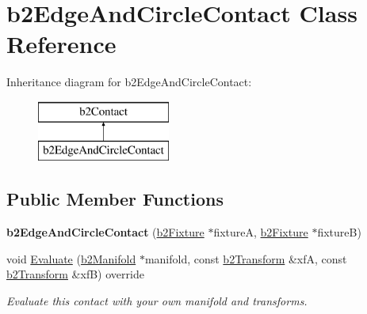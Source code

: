 \hypertarget{classb2EdgeAndCircleContact}{}\section{b2\+Edge\+And\+Circle\+Contact Class Reference}
\label{classb2EdgeAndCircleContact}
Inheritance diagram for b2\+Edge\+And\+Circle\+Contact\+:\begin{figure}[H]
\begin{center}
\leavevmode
\includegraphics[height=2.000000cm]{classb2EdgeAndCircleContact}
\end{center}
\end{figure}
\subsection*{Public Member Functions}
\begin{DoxyCompactItemize}
\item 
\mbox{\label{classb2EdgeAndCircleContact_a9de91d6afe4d2407f679b2ccaded9c02}} 
{\bfseries b2\+Edge\+And\+Circle\+Contact} (\mbox{\hyperlink{classb2Fixture}{b2\+Fixture}} $\ast$fixtureA, \mbox{\hyperlink{classb2Fixture}{b2\+Fixture}} $\ast$fixtureB)
\item 
\mbox{\label{classb2EdgeAndCircleContact_aec021f688dcf2b5a2c483edde476d4b6}} 
void \mbox{\hyperlink{classb2EdgeAndCircleContact_aec021f688dcf2b5a2c483edde476d4b6}{Evaluate}} (\mbox{\hyperlink{structb2Manifold}{b2\+Manifold}} $\ast$manifold, const \mbox{\hyperlink{structb2Transform}{b2\+Transform}} \&xfA, const \mbox{\hyperlink{structb2Transform}{b2\+Transform}} \&xfB) override
\begin{DoxyCompactList}\small\item\em Evaluate this contact with your own manifold and transforms. \end{DoxyCompactList}\end{DoxyCompactItemize}
